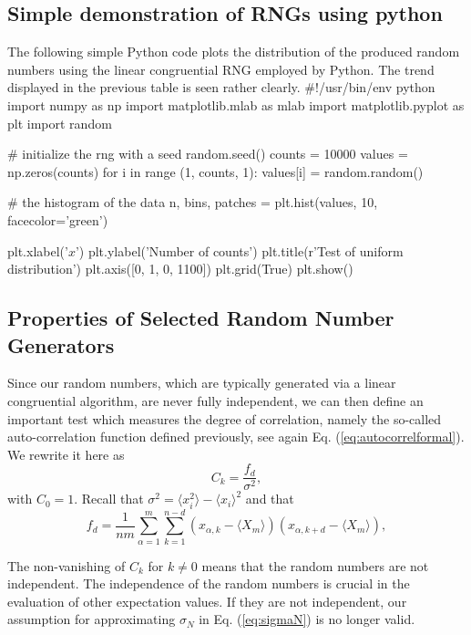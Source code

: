 \documentclass[%
oneside,                 %
final,                   %
10pt]{article}
\newenvironment{block_mdfboxadmon}[1][]{
\begin{block_mdfboxmdframed}[frametitle=#1]
}
{
\end{block_mdfboxmdframed}
}
\begin{document}
\subsection{Simple demonstration of RNGs using python}

\begin{block_mdfboxadmon}[]
The following simple Python code plots the distribution of the produced random numbers using the linear congruential RNG employed by Python. The trend displayed in the previous table is seen rather clearly.
\bpypro
#!/usr/bin/env python
import numpy as np
import matplotlib.mlab as mlab
import matplotlib.pyplot as plt
import random

# initialize the rng with a seed
random.seed() 
counts = 10000
values = np.zeros(counts)   
for i in range (1, counts, 1):
    values[i] = random.random()

# the histogram of the data
n, bins, patches = plt.hist(values, 10, facecolor='green')

plt.xlabel('$x$')
plt.ylabel('Number of counts')
plt.title(r'Test of uniform distribution')
plt.axis([0, 1, 0, 1100])
plt.grid(True)
plt.show()
\epypro
\end{block_mdfboxadmon} %




\subsection{Properties of Selected Random Number Generators}

\begin{block_mdfboxadmon}[]
Since our random numbers, which are typically generated via a linear congruential algorithm,
are never fully independent, we can then define 
an important test which measures the degree of correlation, namely the  so-called  
auto-correlation function defined previously, see again Eq. (\ref{eq:autocorrelformal}).
We rewrite it here as
\begin{equation*}
    C_k=\frac{f_d}
             {\sigma^2},
\end{equation*}
with $C_0=1$. Recall that 
$\sigma^2=\langle x_i^2\rangle-\langle x_i\rangle^2$ and that
\begin{equation*}
f_d = \frac{1}{nm}\sum_{\alpha=1}^m\sum_{k=1}^{n-d}(x_{\alpha,k}-\langle X_m \rangle)(x_{\alpha,k+d}-\langle X_m \rangle),
\end{equation*}


The non-vanishing of $C_k$ for $k\ne 0$ means that the random
numbers are not independent. The independence of the random numbers is crucial 
in the evaluation of other expectation values. If they are not independent, our
assumption for approximating $\sigma_N$ in Eq. (\ref{eq:sigmaN}) is no longer valid.
\end{block_mdfboxadmon} %
\end{document}
